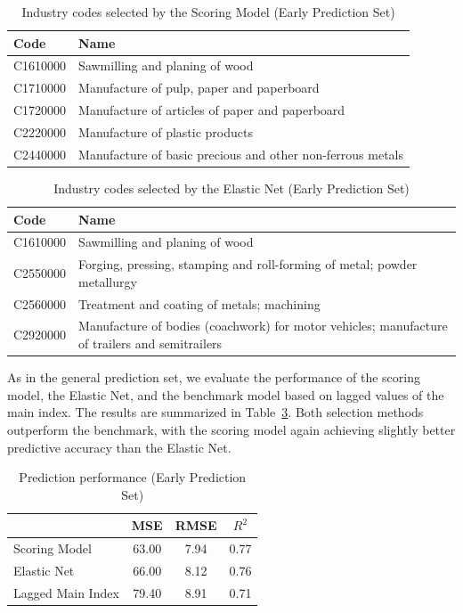 \begin{table}[htbp]
    \centering
    \caption{Industry codes selected by the Scoring Model (Early Prediction Set)}
    \label{tab:sm_sectors_early}
    \small
    \begin{tabularx}{0.9\linewidth}{lX}
        \toprule
        Code & Name \\
        \midrule
        C1610000 & Sawmilling and planing of wood \\
        C1710000 & Manufacture of pulp, paper and paperboard \\
        C1720000 & Manufacture of articles of paper and paperboard \\
        C2220000 & Manufacture of plastic products \\
        C2440000 & Manufacture of basic precious and other non-ferrous metals \\
        \bottomrule
    \end{tabularx}
\end{table}

\begin{table}[H]
    \centering
    \caption{Industry codes selected by the Elastic Net (Early Prediction Set)}
    \label{tab:en_sectors_early}
    \small
    \begin{tabularx}{0.9\linewidth}{lX}
        \toprule
        Code & Name \\
        \midrule
        C1610000 & Sawmilling and planing of wood \\
        C2550000 & Forging, pressing, stamping and roll-forming of metal; powder metallurgy \\
        C2560000 & Treatment and coating of metals; machining \\
        C2920000 & Manufacture of bodies (coachwork) for motor vehicles; manufacture of trailers and semitrailers \\
        \bottomrule
    \end{tabularx}
\end{table}

As in the general prediction set, we evaluate the performance of the scoring model, the Elastic Net, and the benchmark model based on lagged values of the main index. The results are summarized in Table~\ref{tab:early_results}. Both selection methods outperform the benchmark, with the scoring model again achieving slightly better predictive accuracy than the Elastic Net.

\begin{table}[H]
    \centering
    \caption{Prediction performance (Early Prediction Set)}
    \label{tab:early_results}
    \small
    \begin{tabular}{lccc}
        \toprule
         & \textbf{MSE} & \textbf{RMSE} & \textbf{$R^2$} \\
        \midrule
        Scoring Model     & 63.00 & 7.94 & 0.77 \\
        Elastic Net       & 66.00 & 8.12 & 0.76 \\
        Lagged Main Index & 79.40 & 8.91 & 0.71 \\
        \bottomrule
    \end{tabular}
\end{table}

